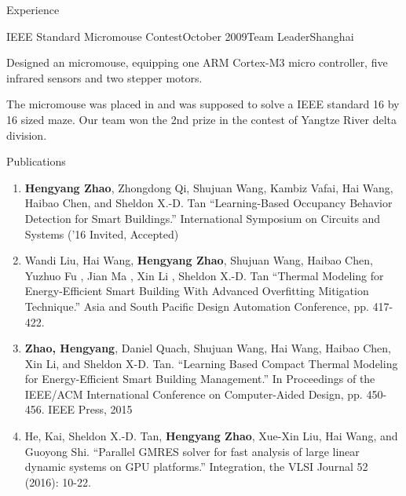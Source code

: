 \documentclass{resume} %
\begin{document}
\begin{rSection}{Experience}
\begin{rSubsection}{IEEE Standard Micromouse Contest}{October 2009}{Team Leader}{Shanghai}
    \item Designed an micromouse, equipping one ARM Cortex-M3 micro controller,
        five infrared sensors and two stepper motors.

    \item The micromouse was placed in and was supposed to solve a IEEE
        standard 16 by 16 sized maze.  Our team won the 2nd prize in the
        contest of Yangtze River delta division.

    \end{rSubsection}

\end{rSection}


\begin{rSection}{Publications}

\begin{enumerate}

    \item \textbf{Hengyang Zhao}, Zhongdong Qi, Shujuan Wang, Kambiz Vafai, Hai
        Wang, Haibao Chen, and Sheldon X.-D. Tan ``Learning-Based Occupancy
        Behavior Detection for Smart Buildings.'' International Symposium on
        Circuits and Systems ('16 Invited, Accepted)

    \item Wandi Liu, Hai Wang, \textbf{Hengyang Zhao}, Shujuan Wang, Haibao
        Chen, Yuzhuo Fu , Jian Ma , Xin Li , Sheldon X.-D. Tan ``Thermal
        Modeling for Energy-Efficient Smart Building With Advanced Overfitting
        Mitigation Technique.'' Asia and South Pacific Design Automation
        Conference, pp.  417-422.

    \item \textbf{Zhao, Hengyang}, Daniel Quach, Shujuan Wang, Hai Wang, Haibao
        Chen, Xin Li, and Sheldon X-D. Tan. ``Learning Based Compact Thermal
        Modeling for Energy-Efficient Smart Building Management.'' In
        Proceedings of the IEEE/ACM International Conference on Computer-Aided
        Design, pp.  450-456. IEEE Press, 2015

    \item He, Kai, Sheldon X.-D. Tan, \textbf{Hengyang Zhao}, Xue-Xin Liu, Hai Wang, and
        Guoyong Shi. ``Parallel GMRES solver for fast analysis of large linear
        dynamic systems on GPU platforms.'' Integration, the VLSI Journal 52
        (2016): 10-22.

\end{enumerate}

\end{rSection}
\end{document}
